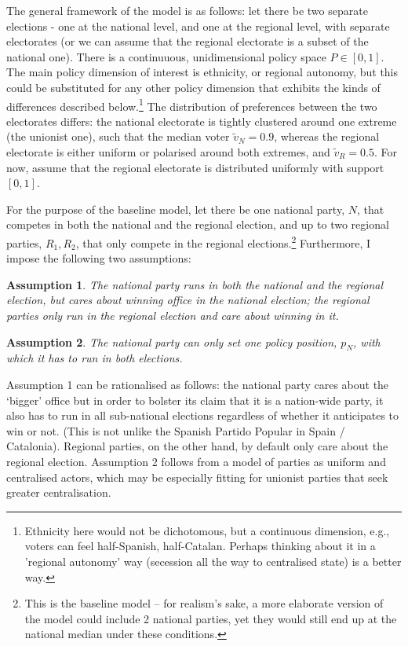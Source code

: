 \documentclass[11pt]{article}
\newtheorem{assumption}{Assumption}
\begin{document}
The general framework of the model is as follows: let there be two separate elections - one at the national level, and one at the regional level, with separate electorates (or we can assume that the regional electorate is a subset of the national one). There is a continuuous, unidimensional policy space $P \in [0, 1]$. The main policy dimension of interest is ethnicity, or regional autonomy, but this could be substituted for any other policy dimension that exhibits the kinds of differences described below.\footnote{Ethnicity here would not be dichotomous, but a continuous dimension, e.g., voters can feel half-Spanish, half-Catalan. Perhaps thinking about it in a 'regional autonomy' way (secession all the way to centralised state) is a better way.} The distribution of preferences between the two electorates differs: the national electorate is tightly clustered around one extreme (the unionist one), such that the median voter $\tilde{v}_N = 0.9$, whereas the regional electorate is either uniform or polarised around both extremes, and $\tilde{v}_R = 0.5$. For now, assume that the regional electorate is distributed uniformly with support $[0, 1]$.

For the purpose of the baseline model, let there be one national party, $N$, that competes in both the national and the regional election, and up to two regional parties, $R_1, R_2$, that only compete in the regional elections.\footnote{This is the baseline model -- for realism's sake, a more elaborate version of the model could include 2 national parties, yet they would still end up at the national median under these conditions.} Furthermore, I impose the following two assumptions:

\begin{assumption}
    The national party runs in both the national and the regional election, but cares about winning office in the national election; the regional parties only run in the regional election and care about winning in it.
\end{assumption}
\begin{assumption}
    The national party can only set one policy position, $p_N$, with which it has to run in both elections.
\end{assumption}

Assumption 1 can be rationalised as follows: the national party cares about the `bigger' office but in order to bolster its claim that it is a nation-wide party, it also has to run in all sub-national elections regardless of whether it anticipates to win or not. (This is not unlike the Spanish Partido Popular in Spain / Catalonia). Regional parties, on the other hand, by default only care about the regional election. Assumption 2 follows from a model of parties as uniform and centralised actors, which may be especially fitting for unionist parties that seek greater centralisation.
\end{document}
